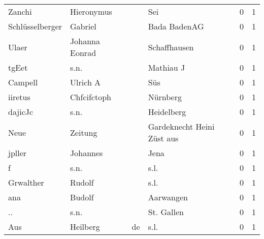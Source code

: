\begin{center}
\begin{tiny}
\begin{longtabu}{llllrr}
                   Zanchi &                         Hieronymus &             &                                         Sei &          0 &         1 \\
          Schlüsselberger &                            Gabriel &             &                                Bada BadenAG &          0 &         1 \\
                    Ulaer &                     Johanna Eonrad &             &                                Schaffhausen &          0 &         1 \\
                    tgEet &                               s.n. &             &                                   Mathiau J &          0 &         1 \\
                  Campell &                           Ulrich A &             &                                         Süs &          0 &         1 \\
                  iiretus &                        Chfcifctoph &             &                                    Nürnberg &          0 &         1 \\
                  dajicJc &                               s.n. &             &                                  Heidelberg &          0 &         1 \\
                     Neue &                            Zeitung &             &                  Gardeknecht Heini Züst aus &          0 &         1 \\
                   jpller &                           Johannes &             &                                        Jena &          0 &         1 \\
                        f &                               s.n. &             &                                        s.l. &          0 &         1 \\
                Grwalther &                             Rudolf &             &                                        s.l. &          0 &         1 \\
                      ana &                             Budolf &             &                                   Aarwangen &          0 &         1 \\
                       .. &                               s.n. &             &                                  St. Gallen &          0 &         1 \\
                      Aus &                           Heilberg &          de &                                        s.l. &          0 &         1 \\

\end{longtabu}
\end{tiny}
\end{center}
